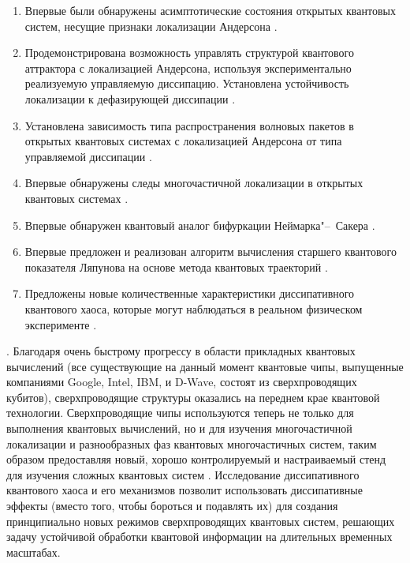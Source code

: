 {\novelty}
\begin{enumerate}[beginpenalty=10000] %
	\item Впервые были обнаружены асимптотические состояния открытых квантовых систем, несущие признаки локализации Андерсона \cite{Yusipov2017}.
	\item Продемонстрирована возможность управлять структурой квантового аттрактора с локализацией Андерсона, используя экспериментально реализуемую управляемую диссипацию. Установлена устойчивость локализации к дефазирующей диссипации \cite{Vershinina2017}.
	\item Установлена зависимость типа распространения волновых пакетов в открытых квантовых системах с локализацией Андерсона от типа управляемой диссипации \cite{Yusipov2018}.
	\item Впервые обнаружены следы многочастичной локализации в открытых квантовых системах \cite{Vakulchyk2018}.
	\item Впервые обнаружен квантовый аналог бифуркации Неймарка"--~Сакера \cite{Yusipov2019_1}.
	\item Впервые предложен и реализован алгоритм вычисления старшего квантового показателя Ляпунова на основе метода квантовых траекторий \cite{Yusipov2019_2}.
	\item Предложены новые количественные характеристики диссипативного квантового хаоса, которые могут наблюдаться в реальном физическом эксперименте \cite{Yusipov2020}.
\end{enumerate}

{\influence}. Благодаря очень быстрому прогрессу в области прикладных квантовых вычислений (все существующие на данный момент квантовые чипы, выпущенные компаниями Google, Intel, IBM, и D-Wave, состоят из сверхпроводящих кубитов), сверхпроводящие структуры оказались на переднем крае квантовой технологии. 
Сверхпроводящие чипы используются теперь не только для выполнения квантовых вычислений, но и для изучения многочастичной локализации \autocite{Roushan2017} и разнообразных фаз квантовых многочастичных систем, таким образом предоставляя новый, хорошо контролируемый и настраиваемый стенд для изучения сложных квантовых систем \autocite{Barends2015}. 
Исследование диссипативного квантового хаоса и его механизмов позволит использовать диссипативные эффекты (вместо того, чтобы бороться и подавлять их) для создания принципиально новых режимов сверхпроводящих квантовых систем, решающих задачу устойчивой обработки квантовой информации на длительных временных масштабах.

